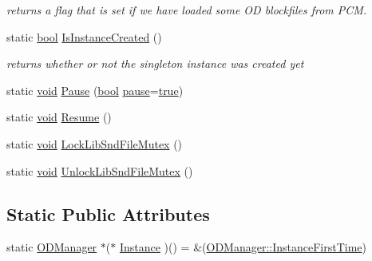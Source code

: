 \begin{DoxyCompactItemize}
\begin{DoxyCompactList}\small\item\em returns a flag that is set if we have loaded some OD blockfiles from P\+CM. \end{DoxyCompactList}\item 
static \hyperlink{mac_2config_2i386_2lib-src_2libsoxr_2soxr-config_8h_abb452686968e48b67397da5f97445f5b}{bool} \hyperlink{class_o_d_manager_a6647fc26402ceed611a794b7224063a5}{Is\+Instance\+Created} ()
\begin{DoxyCompactList}\small\item\em returns whether or not the singleton instance was created yet \end{DoxyCompactList}\item 
static \hyperlink{sound_8c_ae35f5844602719cf66324f4de2a658b3}{void} \hyperlink{class_o_d_manager_a396dd3991addcafba105966dbe00e163}{Pause} (\hyperlink{mac_2config_2i386_2lib-src_2libsoxr_2soxr-config_8h_abb452686968e48b67397da5f97445f5b}{bool} \hyperlink{winmain2_8h_aef3a6553bfd1b1958085c0ea353c0fa8}{pause}=\hyperlink{mac_2config_2i386_2lib-src_2libsoxr_2soxr-config_8h_a41f9c5fb8b08eb5dc3edce4dcb37fee7}{true})
\item 
static \hyperlink{sound_8c_ae35f5844602719cf66324f4de2a658b3}{void} \hyperlink{class_o_d_manager_acb332656b440294d52b48bbf6bf1b2fc}{Resume} ()
\item 
static \hyperlink{sound_8c_ae35f5844602719cf66324f4de2a658b3}{void} \hyperlink{class_o_d_manager_a9229bb31acd18ddc7c3e75dd78e4d263}{Lock\+Lib\+Snd\+File\+Mutex} ()
\item 
static \hyperlink{sound_8c_ae35f5844602719cf66324f4de2a658b3}{void} \hyperlink{class_o_d_manager_a046fb8a887ed44e9a6a2497b21ddd8fc}{Unlock\+Lib\+Snd\+File\+Mutex} ()
\end{DoxyCompactItemize}
\subsection*{Static Public Attributes}
\begin{DoxyCompactItemize}
\item 
static \hyperlink{class_o_d_manager}{O\+D\+Manager} $\ast$($\ast$ \hyperlink{class_o_d_manager_aef1bcdded223f015b22a0d1d439c23ad}{Instance} )() = \&(\hyperlink{class_o_d_manager_a52c00180c54d079fa0bda3da113aa2b2}{O\+D\+Manager\+::\+Instance\+First\+Time})
\end{DoxyCompactItemize}
